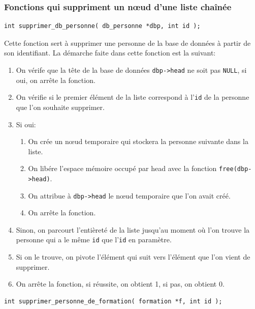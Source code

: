 \documentclass[11pt]{article}
\begin{document}
\subsubsection{Fonctions qui suppriment un n\oe{}ud d'une liste chaînée}

\begin{lstlisting}[firstnumber=216]
  int supprimer_db_personne( db_personne *dbp, int id );
\end{lstlisting}

Cette fonction sert à supprimer une personne de la base de données à partir de son identifiant. La démarche faite dans cette fonction est la suivant:
\begin{enumerate}
\item On vérife que la tête de la base de données \texttt{dbp->head} ne soit pas \texttt{NULL}, si oui, on arrête la fonction.
\item On vérifie si le premier élément de la liste correspond à l'\texttt{id} de la personne que l'on souhaite supprimer.
\item Si oui:
  \begin{enumerate}
  \item On crée un n\oe{}ud temporaire qui stockera la personne suivante dans la liste.
  \item On libére l'espace mémoire occupé par head avec la fonction \texttt{free(dbp->head)}.
  \item On attribue à \texttt{dbp->head} le n\oe{}ud temporaire que l'on avait créé.
  \item On arrête la fonction.
  \end{enumerate}
\item Sinon, on parcourt l'entièreté de la liste jusqu'au moment où l'on trouve la personne qui a le même \texttt{id} que l'\texttt{id} en paramètre.
\item Si on le trouve, on pivote l'élément qui suit vers l'élément que l'on vient de supprimer.
\item On arrête la fonction, si réussite, on obtient 1, si pas, on obtient 0.
\end{enumerate}

\begin{lstlisting}[firstnumber=361]
  int supprimer_personne_de_formation( formation *f, int id );
\end{lstlisting}
\end{document}
